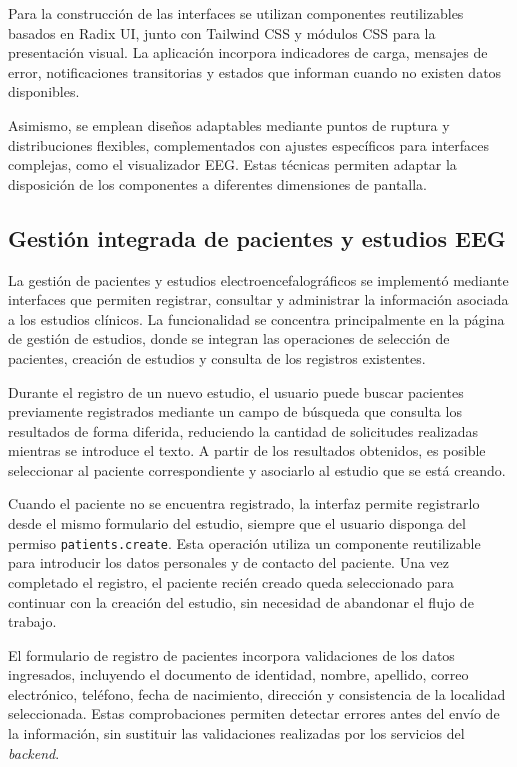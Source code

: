 Para la construcción de las interfaces se
utilizan componentes reutilizables basados
en Radix UI, junto con Tailwind CSS y
módulos CSS para la presentación visual.
La aplicación incorpora indicadores de
carga, mensajes de error, notificaciones
transitorias y estados que informan cuando
no existen datos disponibles.


Asimismo, se emplean diseños adaptables
mediante puntos de ruptura y distribuciones
flexibles, complementados con ajustes
específicos para interfaces complejas,
como el visualizador EEG. Estas técnicas
permiten adaptar la disposición de los
componentes a diferentes dimensiones
de pantalla.


\subsection{Gestión integrada de pacientes y estudios EEG}

La gestión de pacientes y estudios
electroencefalográficos se implementó mediante
interfaces que permiten registrar, consultar
y administrar la información asociada a los
estudios clínicos. La funcionalidad se concentra
principalmente en la página de gestión de estudios,
donde se integran las operaciones de selección
de pacientes, creación de estudios y consulta
de los registros existentes.

Durante el registro de un nuevo estudio,
el usuario puede buscar pacientes previamente
registrados mediante un campo de búsqueda
que consulta los resultados de forma diferida,
reduciendo la cantidad de solicitudes realizadas
mientras se introduce el texto. A partir de
los resultados obtenidos, es posible seleccionar
al paciente correspondiente y asociarlo al
estudio que se está creando.

Cuando el paciente no se encuentra registrado,
la interfaz permite registrarlo desde
el mismo formulario del estudio, siempre que
el usuario disponga del permiso
\texttt{patients.create}. Esta operación
utiliza un componente reutilizable para
introducir los datos personales y de contacto
del paciente. Una vez completado el registro,
el paciente recién creado queda seleccionado
para continuar con la creación del estudio,
sin necesidad de abandonar el flujo de trabajo.

El formulario de registro de pacientes
incorpora validaciones de los datos ingresados,
incluyendo el documento de identidad, nombre,
apellido, correo electrónico, teléfono,
fecha de nacimiento, dirección y consistencia
de la localidad seleccionada. Estas
comprobaciones permiten detectar errores
antes del envío de la información, sin
sustituir las validaciones realizadas
por los servicios del \textit{backend}.

